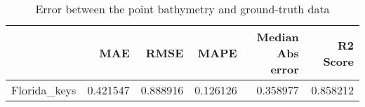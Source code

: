 \begin{table}[h!]
\caption{Error between the point bathymetry and ground-truth data}
\label{tab:Florida_keys_lidar_error}
\begin{tabular}{lrrrrr}
\toprule
 & MAE & RMSE & MAPE & Median Abs error & R2 Score \\
\midrule
Florida_keys & 0.421547 & 0.888916 & 0.126126 & 0.358977 & 0.858212 \\
\bottomrule
\end{tabular}
\end{table}
